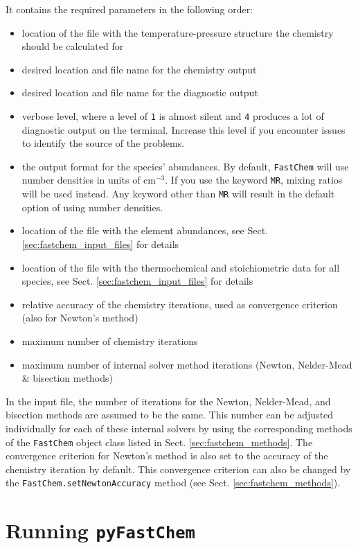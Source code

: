 \documentclass[numbers=noenddot]{fcmanual}
\newcommand{\fc}{\texttt{FastChem}\xspace}
\newcommand{\pfc}{\texttt{pyFastChem}\xspace}
\begin{document}
It contains the required parameters in the following order:
\begin{itemize}
  \item location of the file with the temperature-pressure structure the chemistry should be calculated for
  \item desired location and file name for the chemistry output
  \item desired location and file name for the diagnostic output
  \item verbose level, where a level of \verb|1| is almost silent and \verb|4| produces a lot of diagnostic output on the terminal. Increase this level if you encounter issues to identify the source of the problems.
  \item the output format for the species' abundances. By default, \fc will use number densities in units of cm$^{-3}$. If you use the keyword \verb|MR|, mixing ratios will be used instead. Any keyword other than \verb|MR| will result in the default option of using number densities.
  \item location of the file with the element abundances, see Sect. \ref{sec:fastchem_input_files} for details
  \item location of the file with the thermochemical and stoichiometric data for all species, see Sect. \ref{sec:fastchem_input_files} for details 
  \item relative accuracy of the chemistry iterations, used as convergence criterion (also for Newton's method)
  \item maximum number of chemistry iterations
  \item maximum number of internal solver method iterations (Newton, Nelder-Mead \& bisection methods)
\end{itemize}

In the input file, the number of iterations for the Newton, Nelder-Mead, and bisection methods are assumed to be the same. This number can be adjusted individually for each of these internal solvers by using the corresponding methods of the \fc object class listed in Sect. \ref{sec:fastchem_methods}. The convergence criterion for Newton's method is also set to the accuracy of the chemistry iteration by default. This convergence criterion can also be changed by the \lstinline!FastChem.setNewtonAccuracy! method (see Sect. \ref{sec:fastchem_methods}).


\chapter{Running \pfc}
\end{document}
